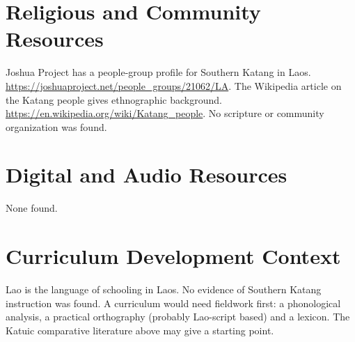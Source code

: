 \documentclass[12pt]{article}
\begin{document}
\section{Religious and Community Resources}
Joshua Project has a people-group profile for Southern Katang in Laos. \url{https://joshuaproject.net/people_groups/21062/LA}. The Wikipedia article on the Katang people gives ethnographic background. \url{https://en.wikipedia.org/wiki/Katang_people}. No scripture or community organization was found.

\section{Digital and Audio Resources}
None found.

\section{Curriculum Development Context}
Lao is the language of schooling in Laos. No evidence of Southern Katang instruction was found. A curriculum would need fieldwork first: a phonological analysis, a practical orthography (probably Lao-script based) and a lexicon. The Katuic comparative literature above may give a starting point.
\end{document}
